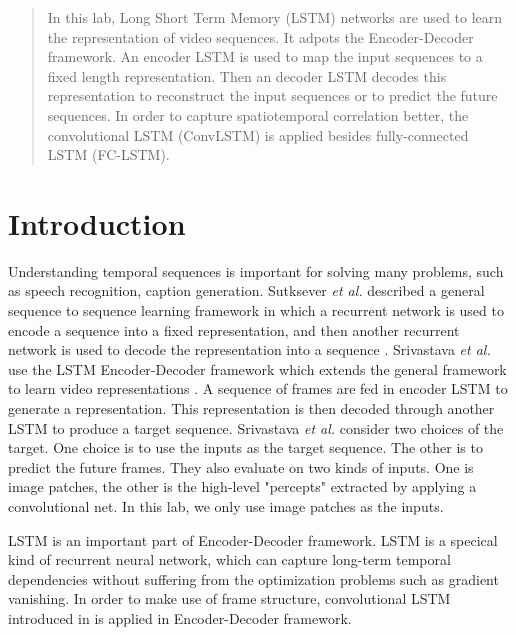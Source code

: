 \documentclass[twoside,a4paper,article]{combine}
\begin{document}


\begin{abstract}
In this lab, Long Short Term Memory (LSTM) networks are used to learn the representation of video sequences. It adpots the Encoder-Decoder
framework. An encoder LSTM is used to map the input sequences to a fixed length representation. Then an decoder LSTM decodes this
representation to reconstruct the input sequences or to predict the future sequences. In order to capture spatiotemporal correlation
better, the convolutional LSTM (ConvLSTM) is applied besides fully-connected LSTM (FC-LSTM).

\end{abstract}

\tableofcontents
\newpage


\section{Introduction}
Understanding temporal sequences is important for solving many problems, such as speech recognition, caption generation. Sutksever
\emph{et al.} described a general sequence to sequence learning framework in which a recurrent network is used to encode a sequence into
a fixed representation, and then another recurrent network is used to decode the representation into a sequence \cite{s2s}.
Srivastava \emph{et al.} use the LSTM Encoder-Decoder framework which extends the general framework to learn video representations
\cite{ulvr}.
A sequence of frames are fed in encoder LSTM to generate a representation. This representation is then decoded through another LSTM to 
produce a target sequence. Srivastava \emph{et al.} consider two choices of the target. One choice is to use the inputs as the target 
sequence. The other is to predict the future frames. They also evaluate on two kinds of inputs. One is image patches, the other is the 
high-level "percepts" extracted by applying a convolutional net. In this lab, we only use image patches as the inputs.

LSTM is an important part of Encoder-Decoder framework. LSTM is a specical kind of recurrent neural network, which can capture long-term
temporal dependencies without suffering from the optimization problems such as gradient vanishing. In order to make use of frame structure,
convolutional LSTM introduced in \cite{convlstm} is applied in Encoder-Decoder framework.
\end{document}
